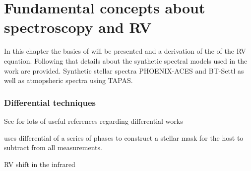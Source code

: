 
\chapter{Fundamental concepts about spectroscopy and RV}
\label{cha:concepts}

In this chapter the basics of \nir{} will be presented and a derivation of the of the RV equation. Following that details about the synthetic spectral models used in the work are provided. Synthetic stellar spectra {PHOENIX-ACES} and {BT-Settl} as well as atmopsheric spectra using {TAPAS}.










\subsection{Differential techniques}
See \citet{kostogryz_spectral_2013} for lots of useful references regarding differential works \citet{simon_disentangling_1994}

\citet{rodler_weighing_2012} uses differential of a series of phases to construct a stellar mask for the host to subtract from all measurements.



RV shift in the infrared